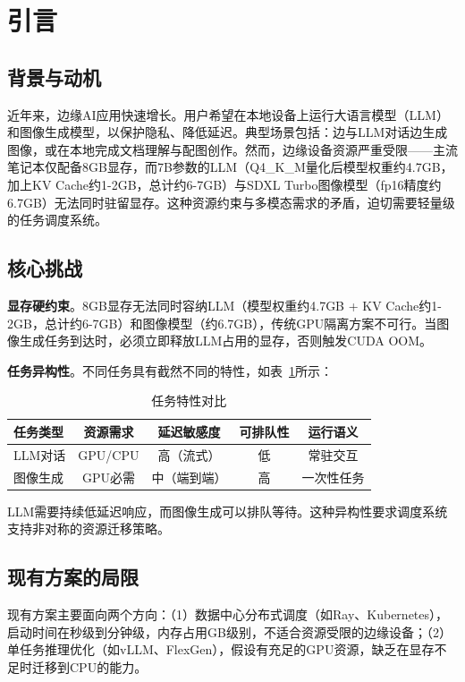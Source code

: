 \section{引言}

\subsection{背景与动机}

近年来，边缘AI应用快速增长。用户希望在本地设备上运行大语言模型（LLM）和图像生成模型，以保护隐私、降低延迟。典型场景包括：边与LLM对话边生成图像，或在本地完成文档理解与配图创作。然而，边缘设备资源严重受限——主流笔记本仅配备8GB显存，而7B参数的LLM（Q4\_K\_M量化后模型权重约4.7GB，加上KV Cache约1-2GB，总计约6-7GB）与SDXL Turbo图像模型（fp16精度约6.7GB）无法同时驻留显存。这种资源约束与多模态需求的矛盾，迫切需要轻量级的任务调度系统。

\subsection{核心挑战}

\textbf{显存硬约束}。8GB显存无法同时容纳LLM（模型权重约4.7GB + KV Cache约1-2GB，总计约6-7GB）和图像模型（约6.7GB），传统GPU隔离方案不可行。当图像生成任务到达时，必须立即释放LLM占用的显存，否则触发CUDA OOM。

\textbf{任务异构性}。不同任务具有截然不同的特性，如表~\ref{tab:task_characteristics}所示：

\begin{table}[htbp]
\caption{任务特性对比}
\label{tab:task_characteristics}
\centering
\begin{tabular}{@{}lcccc@{}}
\toprule
任务类型 & 资源需求 & 延迟敏感度 & 可排队性 & 运行语义 \\
\midrule
LLM对话 & GPU/CPU & 高（流式） & 低 & 常驻交互 \\
图像生成 & GPU必需 & 中（端到端） & 高 & 一次性任务 \\
\bottomrule
\end{tabular}
\end{table}

LLM需要持续低延迟响应，而图像生成可以排队等待。这种异构性要求调度系统支持非对称的资源迁移策略。

\subsection{现有方案的局限}

现有方案主要面向两个方向：（1）数据中心分布式调度（如Ray、Kubernetes），启动时间在秒级到分钟级，内存占用GB级别，不适合资源受限的边缘设备；（2）单任务推理优化（如vLLM、FlexGen），假设有充足的GPU资源，缺乏在显存不足时迁移到CPU的能力。

